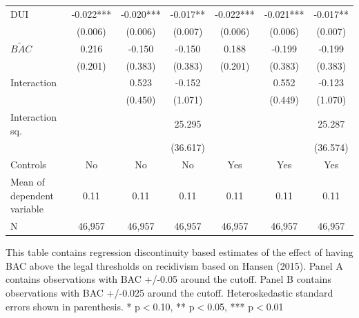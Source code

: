 \documentclass[11pt]{article}\usepackage[]{graphicx}\usepackage[]{color}
\begin{document}
\begin{enumerate}
\begin{table}[htbp]
\begin{center}
\begin{threeparttable}
\begin{tabular}{l*{6}{c}}
DUI                 &      -0.022***&      -0.020***&      -0.017** &      -0.022***&      -0.021***&      -0.017** \\
                    &     (0.006)   &     (0.006)   &     (0.007)   &     (0.006)   &     (0.006)   &     (0.007)   \\
$\tilde{BAC}$             &       0.216   &      -0.150   &      -0.150   &       0.188   &      -0.199   &      -0.199   \\
                    &     (0.201)   &     (0.383)   &     (0.383)   &     (0.201)   &     (0.383)   &     (0.383)   \\
Interaction         &               &       0.523   &      -0.152   &               &       0.552   &      -0.123   \\
                    &               &     (0.450)   &     (1.071)   &               &     (0.449)   &     (1.070)   \\
Interaction sq.      &               &               &      25.295   &               &               &      25.287   \\
                    &               &               &    (36.617)   &               &               &    (36.574)   \\
\midrule
Controls   & No			& No			& No 	& Yes 		& Yes 		& Yes  \\
Mean of dependent variable&        0.11   &        0.11   &        0.11   &        0.11   &        0.11   &        0.11   \\
N                   &      46,957   &      46,957   &      46,957   &      46,957   &      46,957   &      46,957   \\
\bottomrule
\end{tabular}
\begin{tablenotes}
\tiny
\item This table contains regression discontinuity based estimates of the effect of having BAC above the legal thresholds on recidivism based on Hansen (2015). Panel A contains observations with BAC +/-0.05 around the cutoff. Panel B contains observations with BAC +/-0.025 around the cutoff. Heteroskedastic standard errors shown in parenthesis.  * p$<$0.10, ** p$<$0.05, *** p$<$0.01
\end{tablenotes}
\end{threeparttable}
\end{center}
\end{table}


\end{enumerate}
\end{document}
